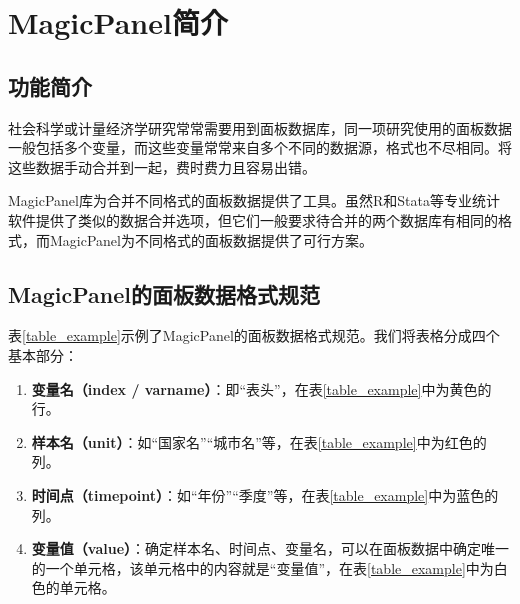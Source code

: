 \documentclass[a4paper, UTF8, fontset=none]{ctexart}
\author{zyfcode@outlook.com}
\date{最后更新：\today}
\begin{document}
\maketitle
\tableofcontents
\newpage

\section{MagicPanel简介}

\subsection{功能简介}

社会科学或计量经济学研究常常需要用到面板数据库，同一项研究使用的面板数据一般包括多个变量，而这些变量常常来自多个不同的数据源，格式也不尽相同。将这些数据手动合并到一起，费时费力且容易出错。

MagicPanel库为合并不同格式的面板数据提供了工具。虽然R和Stata等专业统计软件提供了类似的数据合并选项，但它们一般要求待合并的两个数据库有相同的格式，而MagicPanel为不同格式的面板数据提供了可行方案。

\subsection{MagicPanel的面板数据格式规范\label{rules}}

    表\ref{table_example}示例了MagicPanel的面板数据格式规范。我们将表格分成四个基本部分：

    \begin{enumerate}
        \item \textbf{变量名（index / varname）}：即“表头”，在表\ref{table_example}中为黄色的行。
        \item \textbf{样本名（unit）}：如“国家名”“城市名”等，在表\ref{table_example}中为红色的列。
        \item \textbf{时间点（timepoint）}：如“年份”“季度”等，在表\ref{table_example}中为蓝色的列。
        \item \textbf{变量值（value）}：确定样本名、时间点、变量名，可以在面板数据中确定唯一的一个单元格，该单元格中的内容就是“变量值”，在表\ref{table_example}中为白色的单元格。
    \end{enumerate}
\end{document}
